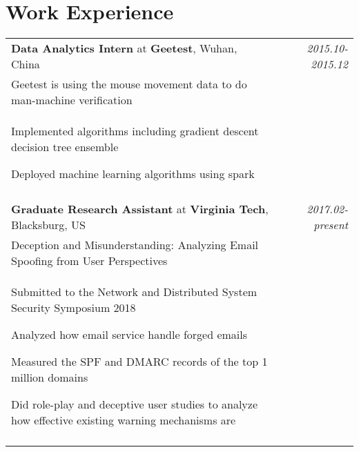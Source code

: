 \documentclass[a4paper,10pt]{article}
\begin{document}
\section{Work Experience}
\begin{tabular}{p{13.5cm}p{0.5cm}r}

\textbf{Data Analytics Intern} at \textbf{Geetest}, Wuhan, China && \emph{2015.10-2015.12} \\
\hspace{1em} Geetest is using the mouse movement data to do man-machine verification&& \vspace{0em} \\
\begin{compactitem}
  \item Implemented algorithms including gradient descent decision tree ensemble\vspace{0.2em}
  \item Deployed machine learning algorithms using spark\vspace{0.2em}
\end{compactitem}&&\vspace{-2.2em} \\
\multicolumn{3}{c}{} \\

\textbf{Graduate Research Assistant} at \textbf{Virginia Tech}, Blacksburg, US && \emph{2017.02-present} \\
\hspace{1em} Deception and Misunderstanding: Analyzing Email Spoofing from User Perspectives && \vspace{0em} \\
\begin{compactitem}
  \item Submitted to the Network and Distributed System Security Symposium 2018
  \item Analyzed how email service handle forged emails
  \item Measured the SPF and DMARC records of the top 1 million domains
  \item Did role-play and deceptive user studies to analyze how effective existing warning mechanisms are
  
\end{compactitem}&&\vspace{-2.2em} \\
\multicolumn{3}{c}{} \\

\end{tabular}
\end{document}
